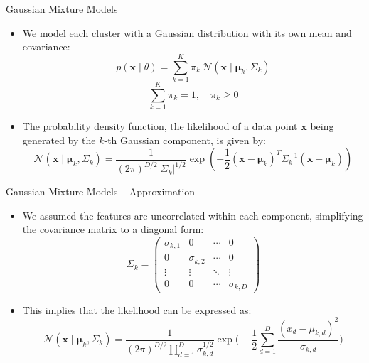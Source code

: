 \begin{frame}{Gaussian Mixture Models}
    \centering
    \begin{itemize}
        \item We model each cluster with a Gaussian distribution with its own mean and covariance:        
        \[
                p(\boldsymbol{x} \mid \theta) = \sum_{k=1}^{K} \pi_k \, \mathcal{N}(\boldsymbol{x} \mid \boldsymbol{\mu}_k, \Sigma_k)
        \]
        \[
            \sum_{k=1}^{K} \pi_k = 1, \quad \pi_k \geq 0
        \]
        \item The probability density function, the likelihood of a data point $\boldsymbol{x}$ being generated by the $k$-th Gaussian component, is given by:
        \[
        \mathcal{N}(\boldsymbol{x} \mid \boldsymbol{\mu}_k, \Sigma_k)
        = \frac{1}{(2\pi)^{D/2} |\Sigma_k|^{1/2}}
        \exp\left( -\frac{1}{2} (\boldsymbol{x} - \boldsymbol{\mu}_k)^T 
        \Sigma_k^{-1} (\boldsymbol{x} - \boldsymbol{\mu}_k) \right)
        \]
    \end{itemize}
\end{frame}

\begin{frame}{Gaussian Mixture Models -- Approximation}
    \centering
    \begin{itemize}
    \item We assumed the features are uncorrelated within each component, simplifying the covariance matrix to a diagonal form:
    \[
    \Sigma_k = 
    \begin{pmatrix}
    \sigma_{k,1} & 0 & \cdots & 0 \\
    0 & \sigma_{k,2} & \cdots & 0 \\
    \vdots & \vdots & \ddots & \vdots \\
    0 & 0 & \cdots & \sigma_{k,D}
    \end{pmatrix}
    \]
    \item This implies that the likelihood can be expressed as:
    \[
    \mathcal{N}(\boldsymbol{x} \mid \boldsymbol{\mu}_k, \Sigma_k)
    = \frac{1}{(2\pi)^{D/2} \prod_{d=1}^D \sigma_{k,d}^{1/2}}
    \exp\Bigg(-\frac{1}{2} \sum_{d=1}^D \frac{(x_d - \mu_{k,d})^2}{\sigma_{k,d}}\Bigg)
    \]
    \end{itemize}
\end{frame}

